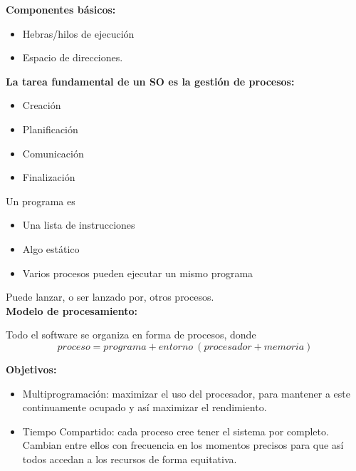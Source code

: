 \documentclass{article}
\begin{document}
\textbf{Componentes básicos:}
\begin{itemize}
\item Hebras/hilos de ejecución
\item Espacio de direcciones.
\end{itemize}

\textbf{La tarea fundamental de un SO es la gestión de procesos:}
\begin{itemize}
\item Creación
\item Planificación
\item Comunicación
\item Finalización
\end{itemize}

Un programa es
\begin{itemize}
\item Una lista de instrucciones
\item Algo estático
\item Varios procesos pueden ejecutar un mismo programa
\end{itemize}

Puede lanzar, o ser lanzado por, otros procesos.\\

\textbf{Modelo de procesamiento:} 

Todo el software se organiza en forma de procesos, donde
\begin{equation*}
proceso=programa+entorno\:(procesador+memoria)
\end{equation*}

\textbf{Objetivos:}
\begin{itemize}
\item Multiprogramación: maximizar el uso del procesador, para mantener a este continuamente ocupado y así maximizar el rendimiento.

\item Tiempo Compartido: cada proceso cree tener el sistema por completo. Cambian entre ellos con frecuencia en los momentos precisos para que así todos accedan a los recursos de forma equitativa.
\end{itemize}
\end{document}
